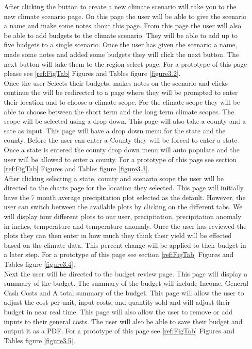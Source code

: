 \documentclass[onecolumn, draftclsnofoot,10pt, compsoc]{article}
\begin{document}
					After clicking the button to create a new climate scenario will take you to the new climate scenario page. On this page the user will be able to give the scenario a name and make some notes about this page. From this page the user will also be able to add budgets to the climate scenario. They will be able to add up to five budgets to a single scenario. Once the user has given the scenario a name, made some notes and added some budgets they will click the next button. The next button will take them to the region select page. For a prototype of this page please see \ref{ref:FigTab} Figures and Tables figure \ref{figure3.2}.\\

					Once the user Selects their budgets, makes notes on the scenario and clicks continue the will be redirected to a page where they will be prompted to enter their location and to choose a climate scope. For the climate scope they will be able to choose between the short term and the long term climate scopes. The scope will be selected using a drop down. This page will also take a county and a sate as input. This page will have a drop down menu for the state and the county. Before the user can enter a County they will be forced to enter a state. Once a state is entered the county drop down menu will auto populate and the user will be allowed to enter a county. For a prototype of this page see section \ref{ref:FigTab} Figures and Tables figure \ref{figure3.3}.\\

					After clicking selecting a state, county and scenario scope the user will be directed to the charts page for the location they selected. This page will initially have the 7 month average precipitation plot selected as the default. However, the user can switch between the available plots by clicking on the different tabs. We will display four different plots to our user, precipitation, precipitation anomaly in inches, temperature and temperature anomaly. Once the user has reviewed the plots they can then enter in how much they think their yield will be effected based on the climate data. This percent change will be applied to their budget in a later step. For a prototype of this page see section \ref{ref:FigTab} Figures and Tables figure \ref{figure3.4}.\\
					
					Next the user will be directed to the budget review page. This page will display a summary of the budget. The summary of the budget will include Income, General Cash Costs and A total summary of the budget. This page will allow the user to adjust the cost per unit, input costs, and quantity sold and will adjust their budget in near real time. This page will also allow the user to remove or add inputs to their general costs. The user will also be able to save their budget and output it as a PDF. For a prototype of this page see \ref{ref:FigTab} Figures and Tables figure \ref{figure3.5}.\\
					
\end{document}
